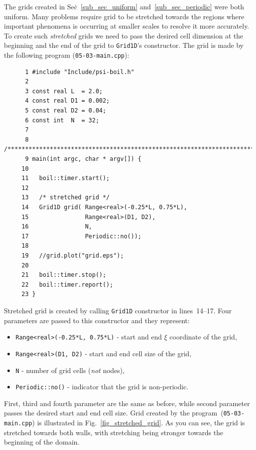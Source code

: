 The grids created in Sec\.~\ref{sub_sec_uniform} and~\ref{sub_sec_periodic}
were both uniform. Many problems require grid to be stretched towards
the regions where important phenomena is occurring at smaller scales to
resolve it more accurately. To create such {\em stretched} grids we need
to pass the desired cell dimension at the beginning and the end of the grid
to {\tt Grid1D}'s constructor. The grid is made by the following program 
({\tt 05-03-main.cpp}):
%
{\small \begin{verbatim}
      1 #include "Include/psi-boil.h"
      2
      3 const real L  = 2.0;
      4 const real D1 = 0.002;
      5 const real D2 = 0.04;
      6 const int  N  = 32;
      7
      8 /****************************************************************************/
      9 main(int argc, char * argv[]) {
     10
     11   boil::timer.start();
     12
     13   /* stretched grid */
     14   Grid1D grid( Range<real>(-0.25*L, 0.75*L),
     15                Range<real>(D1, D2),
     16                N,
     17                Periodic::no());
     18
     19   //grid.plot("grid.eps");
     20
     21   boil::timer.stop();
     22   boil::timer.report();
     23 }
\end{verbatim}}
%
Stretched grid is created by calling {\tt Grid1D} constructor in lines~14--17. 
Four parameters are passed to this constructor and they represent:
%
\begin{itemize}
  \item {\tt Range<real>(-0.25*L, 0.75*L)} - start and end $\xi$ coordinate of the grid,
  \item {\tt Range<real>(D1, D2)}          - start and end cell size of the grid,
  \item {\tt N}                            - number of grid cells ({\em not} nodes),
  \item {\tt Periodic::no()}               - indicator that the grid is non-periodic.
\end{itemize}
%
First, third and fourth parameter are the same as before, while second
parameter passes the desired start and end cell size. Grid created by
the program~({\tt 05-03-main.cpp}) is illustrated in Fig.~\ref{fig_stretched_grid}. 
As you can see, the grid is stretched towards both walls, with stretching
being stronger towards the beginning of the domain.

